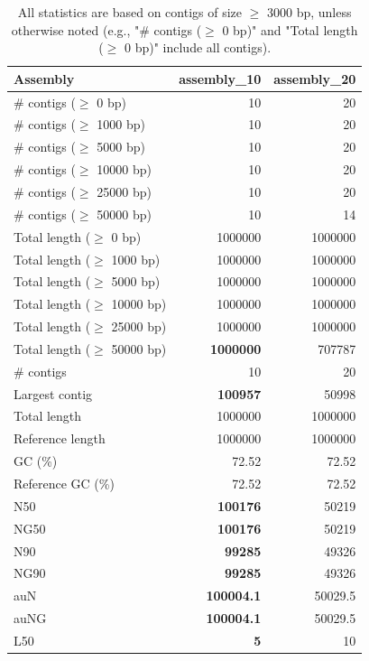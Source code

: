 \documentclass[12pt,a4paper]{article}
\begin{document}
\begin{table}[ht]
\begin{center}
\caption{All statistics are based on contigs of size $\geq$ 3000 bp, unless otherwise noted (e.g., "\# contigs ($\geq$ 0 bp)" and "Total length ($\geq$ 0 bp)" include all contigs).}
\begin{tabular}{|l*{2}{|r}|}
\hline
Assembly & assembly\_10 & assembly\_20 \\ \hline
\# contigs ($\geq$ 0 bp) & 10 & 20 \\ \hline
\# contigs ($\geq$ 1000 bp) & 10 & 20 \\ \hline
\# contigs ($\geq$ 5000 bp) & 10 & 20 \\ \hline
\# contigs ($\geq$ 10000 bp) & 10 & 20 \\ \hline
\# contigs ($\geq$ 25000 bp) & 10 & 20 \\ \hline
\# contigs ($\geq$ 50000 bp) & 10 & 14 \\ \hline
Total length ($\geq$ 0 bp) & 1000000 & 1000000 \\ \hline
Total length ($\geq$ 1000 bp) & 1000000 & 1000000 \\ \hline
Total length ($\geq$ 5000 bp) & 1000000 & 1000000 \\ \hline
Total length ($\geq$ 10000 bp) & 1000000 & 1000000 \\ \hline
Total length ($\geq$ 25000 bp) & 1000000 & 1000000 \\ \hline
Total length ($\geq$ 50000 bp) & {\bf 1000000} & 707787 \\ \hline
\# contigs & 10 & 20 \\ \hline
Largest contig & {\bf 100957} & 50998 \\ \hline
Total length & 1000000 & 1000000 \\ \hline
Reference length & 1000000 & 1000000 \\ \hline
GC (\%) & 72.52 & 72.52 \\ \hline
Reference GC (\%) & 72.52 & 72.52 \\ \hline
N50 & {\bf 100176} & 50219 \\ \hline
NG50 & {\bf 100176} & 50219 \\ \hline
N90 & {\bf 99285} & 49326 \\ \hline
NG90 & {\bf 99285} & 49326 \\ \hline
auN & {\bf 100004.1} & 50029.5 \\ \hline
auNG & {\bf 100004.1} & 50029.5 \\ \hline
L50 & {\bf 5} & 10 \\ \hline

\end{tabular}
\end{center}
\end{table}
\end{document}
